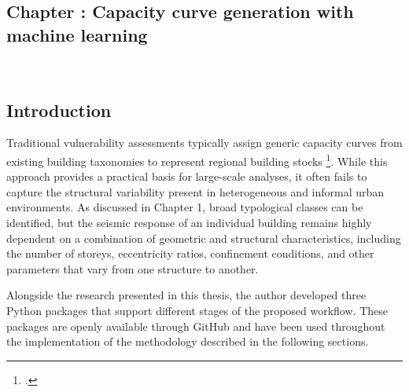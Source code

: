 \graphicspath{
    {figures_and_references/urban_surface_detection/}
    {figures_and_references/footprints_paper/}
    {figures_and_references/EELISA_conference/}
    {figures_and_references/fragility_curves/}
}

\renewcommand{\chapternametext}{Chapter \thechapter: Capacity curve generation with machine learning}

\begin{refsection}

\chapter{\chapternametext}
\

\renewcommand{\headingtextL}{}
\renewcommand{\headingtextR}{\chapternametext}
\begingroup
 \flushbottom
 \setlength{\parskip}{0pt plus 1fil}%
 \localtableofcontents 
\endgroup

\begingroup
 \flushbottom
 \setlength{\parskip}{0pt plus 1fil}%
 \locallistoffigures
\endgroup


\newpage

\setcounter{section}{0} 



\FloatBarrier

\renewcommand{\sectionnametext}{Introduction}
\renewcommand{\headingtextL}{\chapternametext}
\renewcommand{\headingtextR}{\thesection. \sectionnametext}
\section{\sectionnametext}


Traditional vulnerability assessments typically assign generic capacity curves from existing building taxonomies to represent regional building stocks \footcite{yepes-estrada_modeling_2017,barbat_seismic_2010}. While this approach provides a practical basis for large-scale analyses, it often fails to capture the structural variability present in heterogeneous and informal urban environments. As discussed in Chapter 1, broad typological classes can be identified, but the seismic response of an individual building remains highly dependent on a combination of geometric and structural characteristics, including the number of storeys, eccentricity ratios, confinement conditions, and other parameters that vary from one structure to another.

Alongside the research presented in this thesis, the author developed three Python packages that support different stages of the proposed workflow. These packages are openly available through GitHub and have been used throughout the implementation of the methodology described in the following sections.


\end{refsection}
